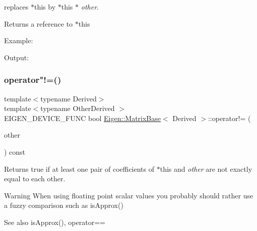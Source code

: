 replaces {\ttfamily $\ast$this} by {\ttfamily $\ast$this} $\ast$ {\itshape other}.

\begin{DoxyReturn}{Returns}
a reference to {\ttfamily $\ast$this} 
\end{DoxyReturn}
Example\+: 
\begin{DoxyCodeInclude}{0}
\end{DoxyCodeInclude}
 Output\+: 
\begin{DoxyVerbInclude}
\end{DoxyVerbInclude}
 \mbox{\label{class_eigen_1_1_matrix_base_a932a37b58d2bad69849a3a8809aaffac}} 
\subsubsection{\texorpdfstring{operator"!=()}{operator!=()}}
{\footnotesize\ttfamily template$<$typename Derived$>$ \\
template$<$typename Other\+Derived $>$ \\
E\+I\+G\+E\+N\+\_\+\+D\+E\+V\+I\+C\+E\+\_\+\+F\+U\+NC bool \mbox{\hyperlink{class_eigen_1_1_matrix_base}{Eigen\+::\+Matrix\+Base}}$<$ Derived $>$\+::operator!= (\begin{DoxyParamCaption}\item[{const \mbox{\hyperlink{class_eigen_1_1_matrix_base}{Matrix\+Base}}$<$ Other\+Derived $>$ \&}]{other }\end{DoxyParamCaption}) const\hspace{0.3cm}{\ttfamily [inline]}}

\begin{DoxyReturn}{Returns}
true if at least one pair of coefficients of {\ttfamily $\ast$this} and {\itshape other} are not exactly equal to each other. 
\end{DoxyReturn}
\begin{DoxyWarning}{Warning}
When using floating point scalar values you probably should rather use a fuzzy comparison such as is\+Approx() 
\end{DoxyWarning}
\begin{DoxySeeAlso}{See also}
is\+Approx(), operator== 
\end{DoxySeeAlso}
\mbox{\label{class_eigen_1_1_matrix_base_a8566b0baaa4cccebbfac4afcc994dc99}} 
